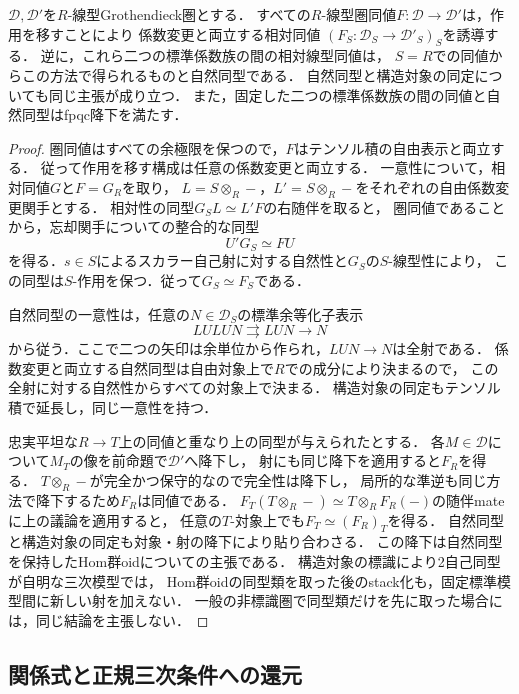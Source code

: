 \begin{lemma}[相対同値の標準延長と一意性]
\label{lem:abel-canonical-family-equivalences}
$\mathcal D,\mathcal D'$を$R$-線型Grothendieck圏とする．
すべての$R$-線型圏同値$F:\mathcal D\to\mathcal D'$は，作用を移すことにより
係数変更と両立する相対同値
$(F_S:\mathcal D_S\to\mathcal D'_S)_S$を誘導する．
逆に，これら二つの標準係数族の間の相対線型同値は，
$S=R$での同値からこの方法で得られるものと自然同型である．
自然同型と構造対象の同定についても同じ主張が成り立つ．
また，固定した二つの標準係数族の間の同値と自然同型はfpqc降下を満たす．
\end{lemma}
\begin{proof}
圏同値はすべての余極限を保つので，$F$はテンソル積の自由表示と両立する．
従って作用を移す構成は任意の係数変更と両立する．
一意性について，相対同値$G$と$F=G_R$を取り，
$L=S\otimes_R-$，$L'=S\otimes_R-$をそれぞれの自由係数変更関手とする．
相対性の同型$G_S L\simeq L'F$の右随伴を取ると，
圏同値であることから，忘却関手についての整合的な同型
\[
 U'G_S\simeq F U
\]
を得る．$s\in S$によるスカラー自己射に対する自然性と$G_S$の$S$-線型性により，
この同型は$S$-作用を保つ．従って$G_S\simeq F_S$である．

自然同型の一意性は，任意の$N\in\mathcal D_S$の標準余等化子表示
\[
 L U L U N\rightrightarrows L U N\longrightarrow N
\]
から従う．ここで二つの矢印は余単位から作られ，$LUN\to N$は全射である．
係数変更と両立する自然同型は自由対象上で$R$での成分により決まるので，
この全射に対する自然性からすべての対象上で決まる．
構造対象の同定もテンソル積で延長し，同じ一意性を持つ．

忠実平坦な$R\to T$上の同値と重なり上の同型が与えられたとする．
各$M\in\mathcal D$について$M_T$の像を前命題で$\mathcal D'$へ降下し，
射にも同じ降下を適用すると$F_R$を得る．
$T\otimes_R-$が完全かつ保守的なので完全性は降下し，
局所的な準逆も同じ方法で降下するため$F_R$は同値である．
$F_T(T\otimes_R-)\simeq T\otimes_R F_R(-)$の随伴mateに上の議論を適用すると，
任意の$T$-対象上でも$F_T\simeq(F_R)_T$を得る．
自然同型と構造対象の同定も対象・射の降下により貼り合わさる．
この降下は自然同型を保持したHom群oidについての主張である．
構造対象の標識により2自己同型が自明な三次模型では，
Hom群oidの同型類を取った後のstack化も，固定標準模型間に新しい射を加えない．
一般の非標識圏で同型類だけを先に取った場合には，同じ結論を主張しない．
\end{proof}


\subsection{関係式と正規三次条件への還元}

